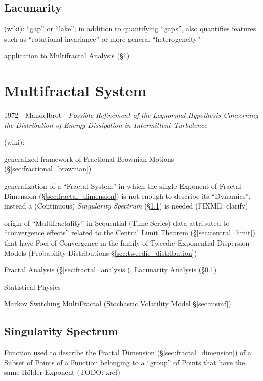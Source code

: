 \subsection{Lacunarity}\label{sec:lacunarity}

(wiki): ``gap'' or ``lake''; in addition to quantifying ``gaps'', also
quantifies features such as ``rotational invariance'' or more general
``heterogeneity''

application to Multifractal Analysis (\S\ref{sec:multifractal_system})



\section{Multifractal System}\label{sec:multifractal_system}

1972 - Mandelbrot - \emph{Possible Refinement of the Lognormal Hypothesis
  Concerning the Distribution of Energy Dissipation in Intermittent Turbulence}

(wiki):

generalized framework of Fractional Brownian Motions
(\S\ref{sec:fractional_brownian})

generalization of a ``Fractal System'' in which the single Exponent of Fractal
Dimension (\S\ref{sec:fractal_dimension}) is not enough to describe its
``Dynamics'',  instead a (Continuous) \emph{Singularity Spectrum}
(\S\ref{sec:singularity_spectrum}) is needed (FIXME: clarify)

origin of ``Multifractality'' in Sequential (Time Series) data attributed to
``convergence effects'' related to the Central Limit Theorem
(\S\ref{sec:central_limit}) that have Foci of Convergence in the family of
Tweedie Exponential Dispersion Models (Probability Distributions
\S\ref{sec:tweedie_distribution})

Fractal Analysis (\S\ref{sec:fractal_analysis}), Lacunarity Analysis
(\S\ref{sec:lacunarity})

Statistical Physics

\fist Markov Switching MultiFractal (Stochastic Volatility Model
\S\ref{sec:msmf})



\subsection{Singularity Spectrum}\label{sec:singularity_spectrum}

Function used to describe the Fractal Dimension (\S\ref{sec:fractal_dimension})
of a Subset of Points of a Fnuction belonging to a ``group'' of Points that have
the same H\"older Exponent (TODO: xref)
